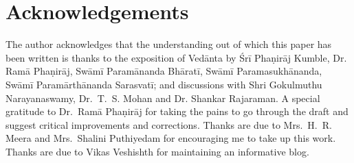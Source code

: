 \newpage

\section*{Acknowledgements}

The author acknowledges that the understanding out of which this paper has been written is thanks to the exposition of Vedānta by Śrī Phaṇirāj Kumble, Dr. Ramā Phaṇirāj, Swāmī Paramānanda Bhāratī, Swāmī Paramasukhānanda, Swāmī Paramārthānanda Sarasvatī; and discussions with Shri Gokulmuthu Narayanaswamy, Dr.~T.~S. Mohan and Dr. Shankar Rajaraman. A special gratitude to Dr.~Ramā Phaṇirāj for taking the pains to go through the draft and suggest critical improvements and corrections. Thanks are due to Mrs.~H.~R. Meera and Mrs.~Shalini Puthiyedam for encouraging me to take up this work. Thanks are due to Vikas Veshishth for maintaining an informative blog.

\newpage

